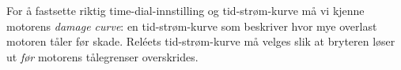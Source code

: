 \vskip 10pt

For å fastsette riktig time-dial-innstilling og tid-strøm-kurve må vi kjenne motorens {\it damage curve}: en tid-strøm-kurve som beskriver hvor mye overlast motoren tåler før skade. Reléets tid-strøm-kurve må velges slik at bryteren løser ut {\it før} motorens tålegrenser overskrides.









